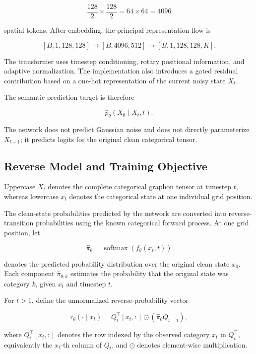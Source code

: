 \[
\frac{128}{2}
\times
\frac{128}{2}
=
64\times64
=
4096
\]

spatial tokens. After embedding, the principal representation flow is

\[
[B,1,128,128]
\longrightarrow
[B,4096,512]
\longrightarrow
[B,1,128,128,K].
\]

The transformer uses timestep conditioning, rotary positional information, and adaptive normalization. The implementation also introduces a gated residual contribution based on a one-hot representation of the current noisy state \(X_t\).

The semantic prediction target is therefore

\[
\widehat{p}_\theta
\left(
X_0
\mid
X_t,t
\right).
\]

The network does not predict Gaussian noise and does not directly parameterize \(X_{t-1}\); it predicts logits for the original clean categorical tensor.


\subsection{Reverse Model and Training Objective}
\label{subsec:method_d3pm_objective}

Uppercase \(X_t\) denotes the complete categorical graphon tensor at timestep \(t\), whereas lowercase \(x_t\) denotes the categorical state at one individual grid position.

The clean-state probabilities predicted by the network are converted into reverse-transition probabilities using the known categorical forward process.
At one grid position, let

\[
\widehat{\pi}_\theta
=
\operatorname{softmax}
\left(
f_\theta(x_t,t)
\right)
\]

denotes the predicted probability distribution over the original clean state \(x_0\).
Each component \(\widehat{\pi}_{\theta,k}\) estimates the probability that the original state was category \(k\), given \(x_t\) and timestep \(t\).

For \(t>1\), define the unnormalized reverse-probability vector

\[
r_\theta(\cdot\mid x_t)
=
Q_t^\top[x_t,:]
\odot
\left(
\widehat{\pi}_\theta
\overline{Q}_{t-1}
\right),
\]

where \(Q_t^\top[x_t,:]\) denotes the row indexed by the observed category \(x_t\) in \(Q_t^\top\), equivalently the \(x_t\)-th column of \(Q_t\), and \(\odot\) denotes element-wise multiplication.

